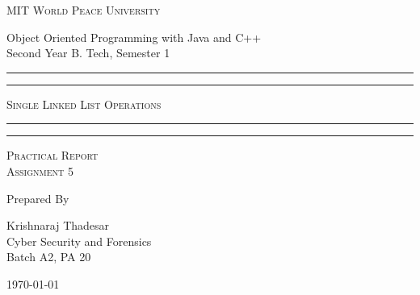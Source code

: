 \documentclass[11pt]{article}
\begin{document}
\begin{titlepage}
	\centering


	\huge\textsc{
		MIT World Peace University
	}\\

	\vspace{0.75\baselineskip} %

	\LARGE{
		Object Oriented Programming with Java and C++\\
		Second Year B. Tech, Semester 1
	}

	\vfill %


	\rule{\textwidth}{1.6pt}\vspace*{-\baselineskip}\vspace*{2pt}
	\rule{\textwidth}{0.6pt}
	\vspace{0.75\baselineskip} %



	\huge{\textsc{
			Single Linked List Operations
		}} \\



	\vspace{0.5\baselineskip} %
	\rule{\textwidth}{0.6pt}\vspace*{-\baselineskip}\vspace*{2.8pt}
	\rule{\textwidth}{1.6pt}

	\vspace{1\baselineskip} %


	\LARGE\textsc{
		Practical Report\\
		Assignment 5
	} %
	\vfill


	Prepared By
	\vspace{0.5\baselineskip} %

	\Large{
		Krishnaraj Thadesar \\
		Cyber Security and Forensics\\
		Batch A2, PA 20
	}


	\vspace{0.5\baselineskip} %
	\today

\end{titlepage}
\end{document}
